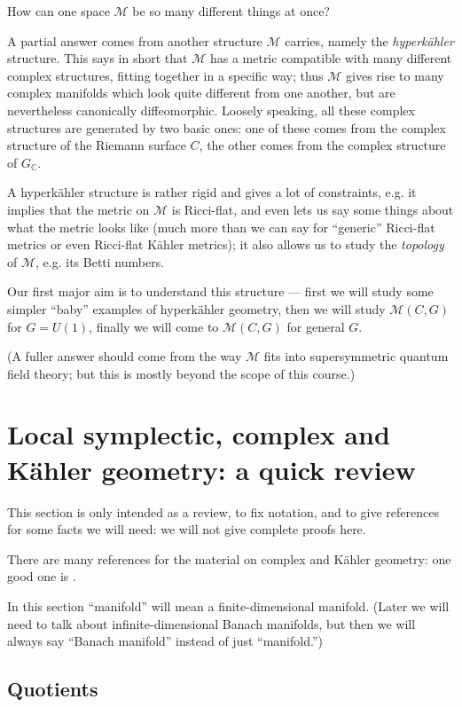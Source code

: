 \documentclass[12pt,letterpaper,reqno]{article}
\numberwithin{equation}{section}
\newcommand{\cM}{\ensuremath{\mathcal M}}
\newcommand{\C}{\ensuremath{\mathbb C}}
\newcommand{\kahler}{K\"ahler\xspace}
\newcommand{\hk}{hyperk\"ahler\xspace}
\newcommand{\ti}[1]{\textit{#1}}
\begin{document}
How can one space $\cM$ be so many different things at once?

A partial answer comes from another structure $\cM$ carries, namely
the \ti{\hk} structure. This says in short that $\cM$ has a
metric compatible with many
different complex structures,
fitting together in a specific way; thus $\cM$ gives rise to
many complex manifolds which look quite different from one
another, but are nevertheless canonically diffeomorphic.
Loosely speaking, all these complex structures are generated
by two basic ones: one of these comes from the complex structure
of the Riemann surface $C$, the other comes from the complex
structure of $G_\C$.

A \hk structure is rather rigid and gives a lot of constraints, e.g.
it implies that the metric on $\cM$ is Ricci-flat, and even lets
us say some things about what the metric looks like (much
more than we can say for ``generic'' Ricci-flat metrics
or even Ricci-flat \kahler metrics);
it also allows us to study the \ti{topology} of $\cM$, e.g.
its Betti numbers.

Our first major aim is to understand this structure --- first
we will study some simpler ``baby'' examples of \hk geometry, then
we will study $\cM(C,G)$ for $G = U(1)$, finally we will
come to $\cM(C,G)$ for general $G$.

(A fuller answer should come from the way $\cM$
fits into supersymmetric quantum field theory; but this is
mostly beyond the scope of this course.)


\section{Local symplectic, complex and \kahler geometry: a quick review}

This section is only intended as a review, to fix notation, and to
give references for some facts we will need: we will not give
complete proofs here.

There are many references for the material on complex
and \kahler geometry: one
good one is \cite{MR2093043}.

In this section ``manifold'' will mean a finite-dimensional
manifold. (Later we will need to talk about
infinite-dimensional Banach manifolds, but then we will
always say ``Banach manifold'' instead of just ``manifold.'')

\subsection{Quotients}
\end{document}
